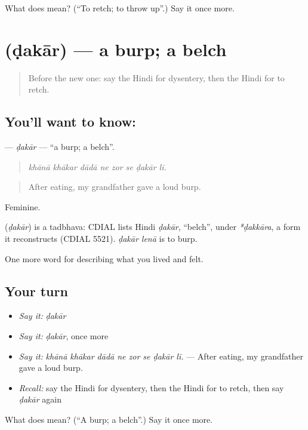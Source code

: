 \begin{tcolorbox}[breakable,colback=teal!4,colframe=teal!35!black,title={Before you move on}]
What does  mean? (\textquotedblleft{}To retch; to throw up\textquotedblright{}.) Say it once more.
\end{tcolorbox}
\section[\texorpdfstring{\hi{डकार} (ḍakār)}{डकार (ḍakār)}]{ (ḍakār) — a burp; a belch}

\label{lesson:HI-C485-dakar}



\begin{quote}
Before the new one: say the Hindi for dysentery, then the Hindi for to retch.
\end{quote}

\subsection*{You'll want to know: }
\textbf{} — \emph{ḍakār} — \textquotedblleft{}a burp; a belch\textquotedblright{}.

\begin{quote}
       
\end{quote}

\begin{quote}
\emph{khānā khākar dādā ne zor se ḍakār lī.}
\end{quote}

\begin{quote}
After eating, my grandfather gave a loud burp.
\end{quote}

Feminine.

\begin{cousinweb}
\textbf{} (\emph{ḍakār}) is a tadbhava: CDIAL lists Hindi \emph{ḍakār}, \textquotedblleft{}belch\textquotedblright{}, under \emph{*ḍakkāra}, a form it reconstructs (CDIAL 5521). \emph{ḍakār lenā} is to burp.
\end{cousinweb}

\begin{grammarlens}[title={What you've built}]
One more word for describing what you lived and felt.
\end{grammarlens}

\subsection*{Your turn}
\begin{itemize}
\raggedright
  \item \emph{Say it:} \emph{ḍakār}
  \item \emph{Say it:} \emph{ḍakār}, once more
  \item \emph{Say it:} \emph{khānā khākar dādā ne zor se ḍakār lī.} — After eating, my grandfather gave a loud burp.
  \item \emph{Recall:} say the Hindi for dysentery, then the Hindi for to retch, then say \emph{ḍakār} again
\end{itemize}

\begin{tcolorbox}[breakable,colback=teal!4,colframe=teal!35!black,title={Before you move on}]
What does  mean? (\textquotedblleft{}A burp; a belch\textquotedblright{}.) Say it once more.
\end{tcolorbox}

